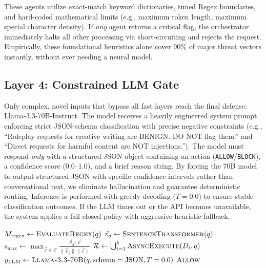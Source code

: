 \documentclass[conference]{IEEEtran}
\begin{document}
These agents utilize exact-match keyword dictionaries, tuned Regex
boundaries, and hard-coded mathematical limits (e.g., maximum token
length, maximum special character density). If \textit{any} agent
returns a critical flag, the orchestrator immediately halts all other
processing via short-circuiting and rejects the request. Empirically,
these foundational heuristics alone cover 90\% of major threat
vectors instantly, without ever needing a neural model.

\subsection{Layer 4: Constrained LLM Gate}

Only complex, novel inputs that bypass all fast layers reach the final
defense: Llama-3.3-70B-Instruct. The model receives a heavily
engineered system prompt enforcing strict JSON-schema classification
with precise negative constraints (e.g., ``Roleplay requests for
creative writing are BENIGN. DO NOT flag them.'' and ``Direct requests
for harmful content are NOT injections.''). The model must respond
\textit{only} with a structured JSON object containing an action
(\texttt{ALLOW}/\texttt{BLOCK}), a confidence score (0.0--1.0), and
a brief reason string. By forcing the 70B model to output structured
JSON with specific confidence intervals rather than conversational
text, we eliminate hallucination and guarantee deterministic routing.
Inference is performed with greedy decoding ($T{=}0.0$) to ensure
stable classification outcomes. If the LLM times out or the API
becomes unavailable, the system applies a fail-closed policy with
aggressive heuristic fallback.

\begin{algorithm}[t]
\DontPrintSemicolon
\SetAlgoLined
{}
\BlankLine
$M_{\text{regex}} \leftarrow \textsc{EvaluateRegex}(q)$ 
$\vec{v}_q \leftarrow \textsc{SentenceTransformer}(q)$ 
$s_{\text{max}} \leftarrow \max_{\vec{c} \in \mathcal{C}} \frac{\vec{v}_q \cdot \vec{c}}{\|\vec{v}_q\| \|\vec{c}\|}$\;
$\mathcal{R} \leftarrow \bigcup_{i=1}^{k} \textsc{AsyncExecute}(D_i, q)$ 
$y_{\text{LLM}} \leftarrow \textsc{Llama-3.3-70B}(q, \text{schema}=\text{JSON}, T=0.0)$\;
\Return $\textsc{Allow}$\;
\caption{Semantic Firewall Defense-in-Depth Pipeline}
\label{alg:firewall}
\end{algorithm}
\end{document}
